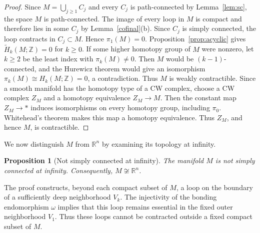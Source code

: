 \documentclass[12pt,oneside,a4paper]{article}
\newtheorem{proposition}[definition]{Proposition}
\theoremstyle{mytheorem}
\theoremstyle{remark}
\theoremstyle{definition}
\begin{document}
\begin{proof}
Since $M=\bigcup_{j\geq1}C_j$
and every $C_j$ is path-connected by Lemma~\ref{lem:sc}, the space
$M$ is path-connected.  The image of every loop in $M$ is compact and
therefore lies in some $C_j$ by Lemma~\ref{cofinal}(b).  Since $C_j$ is
simply connected, the loop contracts in $C_j\subset M$.  Hence
$\pi_1(M)=0$.  Proposition~\ref{prop:acyclic} gives
$\widetilde H_k(M;\mathbb Z)=0$ for $k\geq0$.  If some higher
homotopy group of $M$ were nonzero, let $k\geq2$ be the least index
with $\pi_k(M)\ne0$.  Then $M$ would be $(k-1)$-connected, and the
Hurewicz theorem \cite[Theorem~4.32]{zbMATH02103273} would give an isomorphism
$\pi_k(M)\cong H_k(M;\mathbb Z)=0$, a contradiction.  Thus $M$ is
weakly contractible.  Since a smooth manifold has the homotopy type
of a CW complex, choose a CW complex \(Z_M\) and a homotopy equivalence
$Z_M\to M$.  Then the constant map $Z_M\to *$ induces isomorphisms on every
homotopy group, including \(\pi_0\).  Whitehead's theorem
\cite[Theorem~4.5]{zbMATH02103273} makes this map a homotopy equivalence.
Thus \(Z_M\), and hence $M$, is contractible.
\end{proof}


We now distinguish $M$ from $\mathbb R^n$ by examining its topology
at infinity.

\begin{proposition}[Not simply connected at infinity]\label{prop:sci}
The manifold $M$ is not simply connected at infinity.  Consequently,
$M\not\cong\mathbb R^n$.
\end{proposition}

The proof constructs, beyond each compact subset of $M$, a loop on the
boundary of a sufficiently deep neighborhood $V_k$.  The injectivity of
the bonding endomorphism $\omega$ implies that this loop remains
essential in the fixed outer neighborhood $V_1$.  Thus these loops cannot
be contracted outside a fixed compact subset of $M$.
\end{document}
